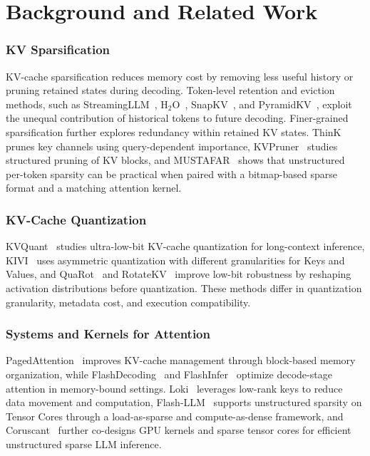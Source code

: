 \documentclass[runningheads]{llncs}
\begin{document}
\section{Background and Related Work}
\label{sec:bg_related}
\subsubsection{KV Sparsification}
KV-cache sparsification reduces memory cost by removing less useful history or pruning retained states during decoding. Token-level retention and eviction methods, such as StreamingLLM~\cite{xiao2024streaming}, H$_2$O~\cite{zhang2023h2o}, SnapKV~\cite{snapkv}, and PyramidKV~\cite{pyramidkv}, exploit the unequal contribution of historical tokens to future decoding. Finer-grained sparsification further explores redundancy within retained KV states. ThinK~\cite{xu2025think} prunes key channels using query-dependent importance, KVPruner~\cite{lv2024kvpruner} studies structured pruning of KV blocks, and MUSTAFAR~\cite{joo2025mustafar} shows that unstructured per-token sparsity can be practical when paired with a bitmap-based sparse format and a matching attention kernel.

\subsubsection{KV-Cache Quantization}
KVQuant~\cite{hooper2024kvquant} studies ultra-low-bit KV-cache quantization for long-context inference, KIVI~\cite{liu2024kivi} uses asymmetric quantization with different granularities for Keys and Values, and QuaRot~\cite{ashkboos2024quarot} and RotateKV~\cite{chen2025rotatekvaccuraterobust} improve low-bit robustness by reshaping activation distributions before quantization. These methods differ in quantization granularity, metadata cost, and execution compatibility.

\subsubsection{Systems and Kernels for Attention}
PagedAttention~\cite{kwon2023pagedattention} improves KV-cache management through block-based memory organization, while FlashDecoding~\cite{hong2024flashdecoding} and FlashInfer~\cite{ye2025flashinfer} optimize decode-stage attention in memory-bound settings. Loki~\cite{singhania2024loki} leverages low-rank keys to reduce data movement and computation, Flash-LLM~\cite{xia2023flashllm} supports unstructured sparsity on Tensor Cores through a load-as-sparse and compute-as-dense framework, and Coruscant~\cite{joo2025coruscant} further co-designs GPU kernels and sparse tensor cores for efficient unstructured sparse LLM inference.
\end{document}
